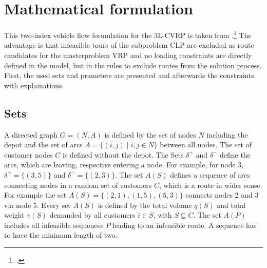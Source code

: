\section{Mathematical formulation}
\label{sec:mathematical_formulation}

This two-index vehicle flow formulation for the \gls{3L-CVRP} is taken from \cite{tamke_branch-and-cut_2024}.\footcite[cf.][p. 6f]{tamke_branch-and-cut_2024}
The advantage is that infeasible tours of the subproblem \gls{CLP} are excluded
as route candidates for the masterproblem \gls{VRP} and no loading constraints are directly defined in the model, but in the rules
to exclude routes from the solution process. First, the used sets and prameters are presented and afterwards the constraints with
explainations.

\subsection*{Sets}
A directed graph $G=(N,A)$ is defined by the set of nodes $N$ including the depot and the set of arcs
$A = \{ (i, j) \mid i, j \in N \}$ between all nodes. The set of customer nodes $C$ is defined without the depot.
The Sets $\delta^+$ and $\delta^-$ define the arcs, which are leaving, respective entering a node.
For example, for node 3, $\delta^+ = \{(3,5)\}$ and $\delta^-= \{(2,3)\}$.
The set $A(S)$ defines a sequence of arcs connecting nodes in a random set of customers $C$,
which is a route in wider sense. For example the set $A(S)=\{(2,1),(1,5),(5,3)\}$ connects nodes
2 and 3 via node 5. Every set $A(S)$ is defined by the total volume $q(S)$ and total weight $v(S)$
demanded by all customers $i \in S$, with $S \subseteq C$. The set $A(P)$ includes all infeasible sequences $P$ leading
to an infeasible route. A sequence has to have the minimum length of two.

